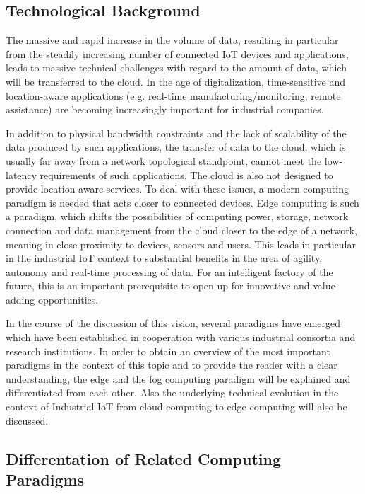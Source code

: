 \subsection{Technological Background}\label{2.1}
 The massive and rapid increase in the volume of data, resulting in particular from the steadily increasing number of connected IoT devices and applications, leads to massive technical challenges with regard to the amount of data, which will be transferred to the cloud. In the age of digitalization, time-sensitive and location-aware applications (e.g. real-time manufacturing/monitoring, remote assistance) are becoming increasingly important for industrial companies.\par
In addition to physical bandwidth constraints and the lack of scalability of the data produced by such applications, the transfer of data to the cloud, which is usually far away from a network topological standpoint, cannot meet the low-latency requirements of such applications. The cloud is also not designed to provide location-aware services. To deal with these issues, a modern computing paradigm is needed that acts closer to connected devices. Edge computing is such a paradigm, which shifts the possibilities of computing power, storage, network connection and data management from the cloud closer to the edge of a network, meaning in close proximity to devices, sensors and users.
 This leads in particular in the industrial IoT context to substantial benefits in the area of agility, autonomy and real-time processing of data. For an intelligent factory of the future, this is an important prerequisite to open up for innovative and value-adding opportunities.\par 
In the course of the discussion of this vision, several paradigms have emerged which have been established in cooperation with various industrial consortia and research institutions. In order to obtain an overview of the most important paradigms in the context of this topic and to provide the reader with a clear understanding, the edge and the fog computing paradigm will be explained and differentiated from each other. Also the underlying technical evolution in the context of Industrial IoT from cloud computing to edge computing will also be discussed.

\subsection{Differentation of Related Computing Paradigms}
\\


